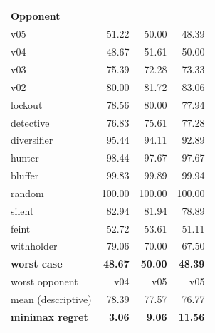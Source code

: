 \begin{tabular}{lrrr}
\toprule
Opponent & \vsix{} & \vfive{} & \vfour{} \\
\midrule
v05 & 51.22 & 50.00 & 48.39 \\
v04 & 48.67 & 51.61 & 50.00 \\
v03 & 75.39 & 72.28 & 73.33 \\
v02 & 80.00 & 81.72 & 83.06 \\
lockout & 78.56 & 80.00 & 77.94 \\
detective & 76.83 & 75.61 & 77.28 \\
diversifier & 95.44 & 94.11 & 92.89 \\
hunter & 98.44 & 97.67 & 97.67 \\
bluffer & 99.83 & 99.89 & 99.94 \\
random & 100.00 & 100.00 & 100.00 \\
silent & 82.94 & 81.94 & 78.89 \\
feint & 52.72 & 53.61 & 51.11 \\
withholder & 79.06 & 70.00 & 67.50 \\
\midrule
\textbf{worst case} & \textbf{48.67} & \textbf{50.00} & \textbf{48.39} \\
worst opponent & v04 & v05 & v05 \\
mean (descriptive) & 78.39 & 77.57 & 76.77 \\
\textbf{minimax regret} & \textbf{3.06} & \textbf{9.06} & \textbf{11.56} \\
\bottomrule
\end{tabular}
